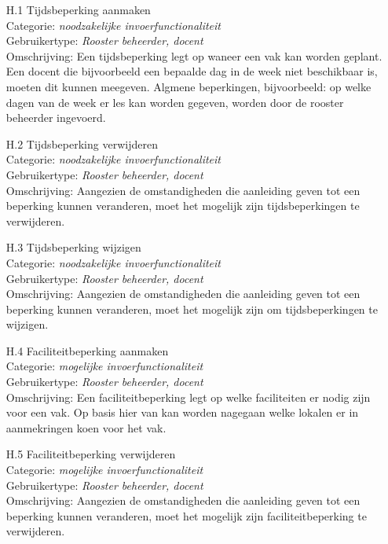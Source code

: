 \documentclass{article}
\begin{document}
\begin{itemize} 
\item[H.1] Tijdsbeperking aanmaken  \\
Categorie: \textit{noodzakelijke  invoerfunctionaliteit} \\
Gebruikertype: \textit{Rooster beheerder, docent} \\
Omschrijving: Een tijdsbeperking legt op waneer een vak kan worden geplant. Een docent die bijvoorbeeld een bepaalde dag in de week niet beschikbaar is, moeten dit kunnen meegeven. Algmene beperkingen, bijvoorbeeld: op welke dagen van de week er les kan worden gegeven, worden door de  rooster beheerder ingevoerd.\\[-3mm]

\item[H.2] Tijdsbeperking verwijderen \\
Categorie: \textit{noodzakelijke invoerfunctionaliteit} \\
Gebruikertype: \textit{Rooster beheerder, docent} \\
Omschrijving: Aangezien de omstandigheden die aanleiding geven tot een beperking kunnen veranderen, moet het mogelijk zijn tijdsbeperkingen te verwijderen. \\[-3mm]

\item[H.3] Tijdsbeperking wijzigen \\
Categorie: \textit{noodzakelijke invoerfunctionaliteit} \\
Gebruikertype: \textit{Rooster beheerder, docent} \\
Omschrijving: Aangezien de omstandigheden die aanleiding geven tot een beperking kunnen veranderen, moet het mogelijk zijn om tijdsbeperkingen te wijzigen.\\[-3mm]

\item[H.4] Faciliteitbeperking aanmaken \\
Categorie: \textit{mogelijke invoerfunctionaliteit} \\
Gebruikertype: \textit{Rooster beheerder, docent} \\
Omschrijving: Een faciliteitbeperking legt op welke faciliteiten er nodig zijn voor een vak. Op basis hier van kan worden nagegaan welke lokalen er in aanmekringen koen voor het vak. 

\item[H.5] Faciliteitbeperking verwijderen \\
Categorie: \textit{mogelijke invoerfunctionaliteit} \\
Gebruikertype: \textit{Rooster beheerder, docent} \\
Omschrijving: Aangezien de omstandigheden die aanleiding geven tot een beperking kunnen veranderen, moet het mogelijk zijn faciliteitbeperking te verwijderen. \\[-3mm]


\end{itemize}
\end{document}
